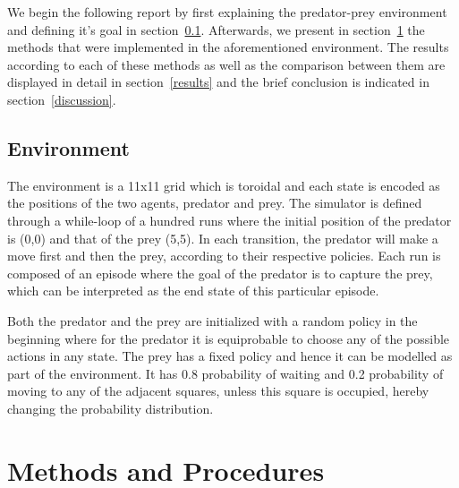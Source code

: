\documentclass[paper=a4, fontsize=11pt]{scrartcl}
\numberwithin{equation}{section}		%
\numberwithin{figure}{section}			%
\numberwithin{table}{section}				%
\begin{document}
We begin the following report by first explaining the predator-prey environment and defining it's goal in section~\ref{environment}. Afterwards, we present in section~\ref{methods} the methods that were implemented in the aforementioned environment. The results according to each of these methods as well as the comparison between them are displayed in detail in section~\ref{results} and the brief conclusion is indicated in section~\ref{discussion}.

\subsection{Environment}
\label{environment}
The environment is a 11x11 grid which is toroidal and each state is encoded as the positions of the two agents, predator and prey.
The simulator is defined through a while-loop of a hundred runs where the initial position of the predator is (0,0) and that of the prey (5,5). In each transition, the predator will make a move first and then the prey, according to their respective policies. Each run is composed of an episode where the goal of the predator is to capture the prey, which can be interpreted as the end state of this particular episode. 

Both the predator and the prey are initialized with a random policy in the beginning where for the predator it is equiprobable to choose any of the possible actions %
in any state. The prey has a fixed policy and hence it can be modelled as part of the environment. It has 0.8 probability of waiting and 0.2 probability of moving to any of the adjacent squares, unless this square is occupied, hereby changing the probability distribution.

\section{Methods and Procedures}
\label{methods}
\end{document}
